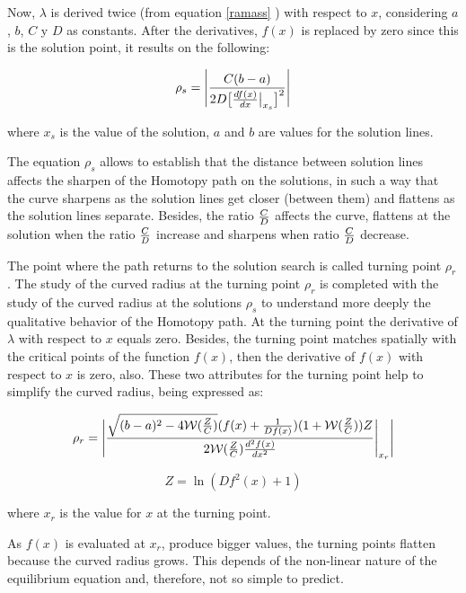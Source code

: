 \documentclass[conference,letterpaper,onecolumn]{IEEEtran}
\begin{document}
Now, $\lambda$ is derived twice (from equation \ref{ramass} ) with respect to $x$, considering $a$, $b$, $C$ y $D$ as constants. After the derivatives, $f(x)$ is replaced by zero since this is the solution point, it results on the following:

\begin{displaymath}
\rho_{s}= \Bigg | {C(b-a) \over 2D\big [{df(x) \over dx} \big |_{x_s} \big ]^2}\Bigg |
\end{displaymath}

where $x_s$ is the value of the solution, $a$ and $b$ are values for the solution lines.

The equation $\rho_{s}$ allows to establish that the distance between solution lines affects the sharpen of the Homotopy path on the solutions, in such a way that the curve sharpens as the solution lines get closer (between them) and flattens as the solution lines separate. Besides, the ratio $C \over D$ affects the curve, flattens at the solution when the ratio $C \over D$ increase and sharpens when ratio $C \over D$ decrease.

The point where the path returns to the solution search is called turning point $\rho_r$. The study of the curved radius at the turning point $\rho_r$ is completed with the study of the curved radius at the solutions $\rho_s$ to understand more deeply the qualitative behavior of the Homotopy path. At the turning point the derivative of $\lambda$ with respect to $x$ equals zero. Besides, the turning point matches spatially with the critical points of the function $f(x)$, then the derivative of $f(x)$ with respect to $x$ is zero, also. These two attributes for the turning point help to simplify the curved radius, being expressed as:

{
\small{
\begin{displaymath}
\rho_{r}=\Bigg | {\sqrt{(b-a)^2-4{\cal{W}}({Z \over C})} (f(x)+ {1 \over Df(x)}) (1+{\cal{W}}({Z \over C}))Z \over
2{\cal{W}}({ Z \over C} )  {d^2f(x) \over dx^2}
} \Bigg |_{x_r} \Bigg |
\end{displaymath}}}

{
\small{
\begin{displaymath}
Z=\ln(Df^2(x)+1)
\end{displaymath}}}

where $x_r$ is the value for $x$ at the turning point.

As $f(x)$ is evaluated at $x_r$, produce bigger values, the turning points flatten because the curved radius grows. This depends of the non-linear nature of the equilibrium equation and, therefore, not so simple to predict.
\end{document}
